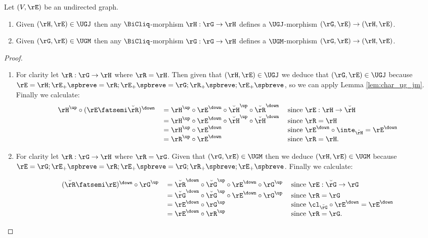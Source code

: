 \documentclass{article}
\begin{document}
\smallskip


\begin{lemma}
\label{lem:lift_bicliq_epi_mono_ugj_ugm}
\item
Let $(V,\rE)$ be an undirected graph.
\begin{enumerate}
\item
Given $(\rH,\rE) \in \UGJ$ then any $\BiCliq$-morphism $\rH : \rG \to \rH$ defines a $\UGJ$-morphism $(\rG,\rE) \to (\rH,\rE)$.
\item
Given $(\rG,\rE) \in \UGM$ then any $\BiCliq$-morphism $\rG : \rG \to \rH$ defines a $\UGM$-morphism $(\rG,\rE) \to (\rH,\rE)$.
\end{enumerate}
\end{lemma}

\begin{proof}
\item
\begin{enumerate}
\item
For clarity let $\rR : \rG \to \rH$ where $\rR = \rH$. Then given that $(\rH,\rE) \in \UGJ$ we deduce that $(\rG,\rE) \in \UGJ$ because $\rE = \rH ; \rE_+\spbreve = \rR ; \rE_+\spbreve = \rG ; \rR_+\spbreve ; \rE_+\spbreve$, so we can apply Lemma \ref{lem:char_ug_jm}. Finally we calculate:
\[
\begin{tabular}{lll}
$\rH^\up \circ (\rE \fatsemi \breve{\rR})^\down$
&
$= \rH^\up \circ \rE^\down \circ \breve{\rH}^\up \circ \breve{\rR}^\down$
& since $\rE : \rH \to \breve{\rH}$
\\&
$= \rH^\up \circ \rE^\down \circ \breve{\rH}^\up \circ \breve{\rH}^\down$
& since $\rR = \rH$
\\&
$= \rH^\up \circ \rE^\down$
& since $\rE^\down \circ \inte_{\breve{\rH}} = \rE^\down$
\\&
$= \rR^\up \circ \rE^\down$
& since $\rR = \rH$.
\end{tabular}
\]

\item
For clarity let $\rR : \rG \to \rH$ where $\rR = \rG$. Given that $(\rG,\rE) \in \UGM$ then we deduce $(\rH,\rE) \in \UGM$ because $\rE = \rG ; \rE_+\spbreve = \rR ; \rE_+\spbreve = \rG ; \rR_+\spbreve ; \rE_+\spbreve$. Finally we calculate:

\[
\begin{tabular}{lll}
$(\breve{\rR} \fatsemi \rE)^\down \circ \rG^\up$
&
$= \breve{\rR}^\down \circ \breve{\rG}^\up \circ \rE^\down \circ \rG^\up$
& since $\rE : \breve{\rG} \to \rG$
\\&
$= \breve{\rG}^\down \circ \breve{\rG}^\up \circ \rE^\down \circ \rG^\up$
& since $\rR = \rG$
\\&
$= \rE^\down \circ \rG^\up$
& since $\cl_{\breve{\rG}} \circ \rE^\down = \rE^\down$
\\&
$= \rE^\down \circ \rR^\up$
& since $\rR = \rG$.
\end{tabular}
\]

\end{enumerate}
\end{proof}
\end{document}
